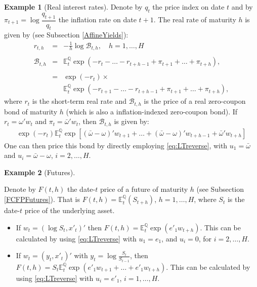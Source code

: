 \documentclass[
  12pt,
]{book}
\theoremstyle{definition}
\theoremstyle{definition}
\newtheorem{example}{Example}[chapter]
\theoremstyle{definition}
\theoremstyle{definition}
\theoremstyle{remark}
\begin{document}
\begin{example}[Real interest rates]
\protect\hypertarget{exm:realBth}{}\label{exm:realBth}Denote by \(q_t\) the price index on date \(t\) and by \(\pi_{t+1} = \log \dfrac{q_{t+1}}{q_t}\) the inflation rate on date \(t+1\). The real rate of maturity \(h\) is given by (see Subsection \ref{AffineYields}):
\begin{eqnarray*}
r_{t,h} & =& -   \frac{1}{h}   \log   \mathcal{B}_{t,h}, \quad h=1,\dots,H \\    \\
\mathcal{B}_{t,h} & =&  \mathbb{E}^{\mathbb{Q}}_t   \exp(-r_{t}-\dots-r_{t+h-1} + \pi_{t+1}+\dots+\pi_{t+h}),  \\      \\
& =& \exp(-r_{t}) \times \\
&& \mathbb{E}^{\mathbb{Q}}_t \exp(-r_{t+1}-\dots-r_{t+h-1}+\pi_{t+1}+\dots+\pi_{t+h}),
\end{eqnarray*}
where \(r_t\) is the short-term real rate and \(\mathcal{B}_{t,h}\) is the price of a real zero-coupon bond of maturity \(h\) (which is also a inflation-indexed zero-coupon bond).
If \(r_t = \omega'w_t\) and \(\pi_t = \bar\omega'w_t\), then \(\mathcal{B}_{t,h}\) is given by:
\begin{eqnarray*}
\exp(-r_{t}) \mathbb{E}^{\mathbb{Q}}_t \exp[(\bar\omega-\omega)'w_{t+1}+\dots+(\bar\omega-\omega)'w_{t+h-1}+\bar\omega'
w_{t+h}]
\end{eqnarray*}
One can then price this bond by directly employing \eqref{eq:LTreverse}, with \(u_1 = \bar\omega\) and \(u_i = \bar\omega-\omega\), \(i = 2,\dots, H\).
\end{example}

\begin{example}[Futures]
\protect\hypertarget{exm:Futures}{}\label{exm:Futures}

Denote by \(F(t,h)\) the date-\(t\) price of a future of maturity \(h\) (see Subsection \ref{FCFPFutures}). That is \(F(t,h) = \mathbb{E}^{\mathbb{Q}}_t (S_{t+h})\), \(h=1,\dots,H\), where \(S_t\) is the date-\(t\) price of the underlying asset.

\begin{itemize}
\item
  If \(w_t = (\log S_t, x'_t)'\) then \(F(t,h) = \mathbb{E}^{\mathbb{Q}}_t \exp(e'_1 w_{t+h})\). This can be calculated by using \eqref{eq:LTreverse} with \(u_1 = e_1\), and \(u_i = 0\), for \(i=2,\dots,H\).
\item
  If \(w_t = (y_t, x'_t)'\) with \(y_t = \log\frac{S_t}{S_{t-1}}\), then \(F(t,h) = S_t \mathbb{E}^{\mathbb{Q}}_t \exp(e'_1 w_{t+1}+\dots+e'_1 w_{t+h})\). This can be calculated by using \eqref{eq:LTreverse} with \(u_i = e'_1\), \(i=1,\dots,H\).
\end{itemize}

\end{example}
\end{document}
